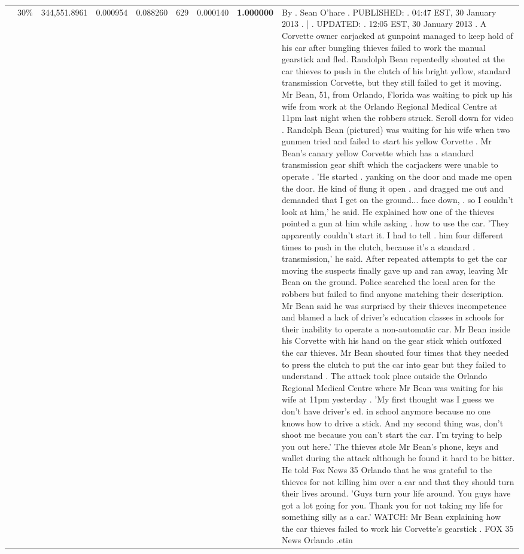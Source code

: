\begin{table}[H]
\begin{tabular}{llrrrrrrl}
 & 30\% & 344,551.8961 & 0.000954 & 0.088260 & \color{red} 629 & 0.000140 & \bfseries \color{red} 1.000000 & By . Sean O'hare . PUBLISHED: . 04:47 EST, 30 January 2013 . | . UPDATED: . 12:05 EST, 30 January 2013 . A Corvette owner carjacked at gunpoint managed to keep hold of his car after bungling thieves failed to work the manual gearstick and fled. Randolph Bean repeatedly shouted at the car thieves to push in the clutch of his bright yellow, standard transmission Corvette, but they still failed to get it moving. Mr Bean, 51, from Orlando, Florida was waiting to pick up his wife from work at the Orlando Regional Medical Centre at 11pm last night when the robbers struck. Scroll down for video . Randolph Bean (pictured) was waiting for his wife when two gunmen tried and failed to start his yellow Corvette . Mr Bean's canary yellow Corvette which has a standard transmission gear shift which the carjackers were unable to operate . 'He started . yanking on the door and made me open the door. He kind of flung it open . and dragged me out and demanded that I get on the ground... face down, . so I couldn't look at him,' he said. He explained how one of the thieves pointed a gun at him while asking . how to use the car. 'They apparently couldn't start it. I had to tell . him four different times to push in the clutch, because it's a standard . transmission,' he said. After repeated attempts to get the car moving the suspects finally gave up and ran away, leaving Mr Bean on the ground. Police searched the local area for the robbers but failed to find anyone matching their description. Mr Bean said he was surprised by their thieves incompetence and blamed a lack of driver's education classes in schools for their inability to operate a non-automatic car. Mr Bean inside his Corvette with his hand on the gear stick which outfoxed the car thieves. Mr Bean shouted four times that they needed to press the clutch to put the car into gear but they failed to understand . The attack took place outside the Orlando Regional Medical Centre where Mr Bean was waiting for his wife at 11pm yesterday . 'My first thought was I guess we don't have driver's ed. in school anymore because no one knows how to drive a stick. And my second thing was, don't shoot me because you can't start the car. I'm trying to help you out here.' The thieves stole Mr Bean's phone, keys and wallet during the attack although he found it hard to be bitter. He told Fox News 35 Orlando that he was grateful to the thieves for not killing him over a car and that they should turn their lives around. 'Guys turn your life around. You guys have got a lot going for you. Thank you for not taking my life for something silly as a car.' WATCH: Mr Bean explaining how the car thieves failed to work his Corvette's gearstick . FOX 35 News Orlando .etin \\

\end{tabular}
\end{table}
